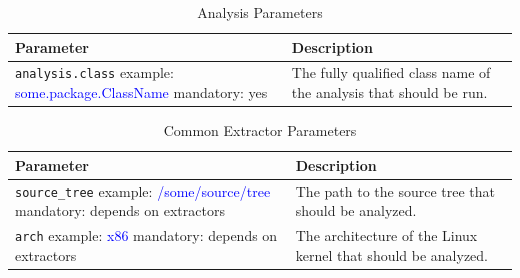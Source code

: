 \begin{table}[t] %
    \caption{Analysis Parameters} \label{tab:propfile}
    \begin{tabularx}{\textwidth}{|p{}|p{}|}\hline
    \textbf{Parameter} & \textbf{Description} \\ \hline \hline
    
    \texttt{analysis.class} \newline example: \textcolor{blue}{some.package.ClassName} \newline mandatory: yes & The fully qualified class name of the analysis that should be run. \\ \hline
    
    \end{tabularx}
\end{table}

\begin{table}[t] %
    \caption{Common Extractor Parameters} \label{tab:propfile}
        \begin{tabularx}{\textwidth}{|p{}|p{}|}\hline
        \textbf{Parameter} & \textbf{Description} \\ \hline \hline
        
        \texttt{source\_tree} \newline example: \textcolor{blue}{/some/source/tree} \newline mandatory: depends on extractors & The path to the source tree that should be analyzed. \\ \hline
        
        \texttt{arch} \newline example: \textcolor{blue}{x86}  \newline mandatory: depends on extractors & The architecture  of the Linux kernel that should be analyzed. \\ \hline
    \end{tabularx}
\end{table}

